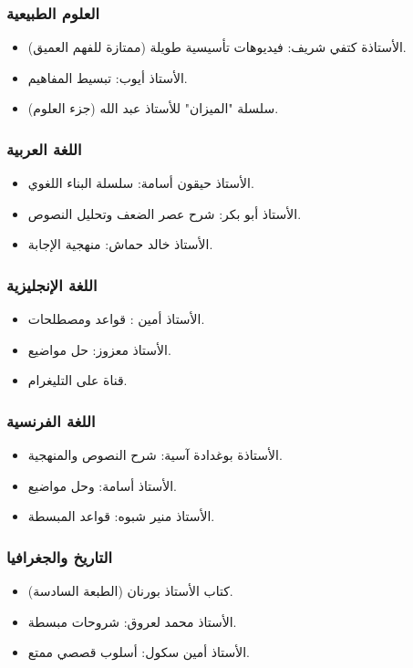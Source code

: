 \documentclass[12pt,a4paper]{book}
\begin{document}
	\subsubsection{العلوم الطبيعية}
	\begin{itemize}
		\item الأستاذة كتفي شريف: فيديوهات تأسيسية طويلة (ممتازة للفهم العميق).
		\item الأستاذ أيوب: تبسيط المفاهيم.
		\item سلسلة "الميزان" للأستاذ عبد الله (جزء العلوم).
	\end{itemize}
	
	\subsubsection{اللغة العربية}
	\begin{itemize}
		\item الأستاذ حيقون أسامة: سلسلة البناء اللغوي.
		\item الأستاذ أبو بكر: شرح عصر الضعف وتحليل النصوص.
		\item الأستاذ خالد حماش: منهجية الإجابة.
	\end{itemize}
	
	\subsubsection{اللغة الإنجليزية}
	\begin{itemize}
		\item الأستاذ أمين : قواعد ومصطلحات.
		\item الأستاذ معزوز: حل مواضيع.
		\item قناة  على التليغرام.
	\end{itemize}
	
	\subsubsection{اللغة الفرنسية}
	\begin{itemize}
		\item الأستاذة بوغدادة آسية: شرح النصوص والمنهجية.
		\item الأستاذ أسامة:  وحل مواضيع.
		\item الأستاذ منير شبوه: قواعد المبسطة.
	\end{itemize}
	
	\subsubsection{التاريخ والجغرافيا}
	\begin{itemize}
		\item كتاب الأستاذ بورنان (الطبعة السادسة).
		\item الأستاذ محمد لعروق: شروحات مبسطة.
		\item الأستاذ أمين سكول: أسلوب قصصي ممتع.
	\end{itemize}
	
\end{document}
